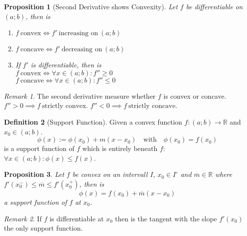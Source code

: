 \documentclass[english,titlepage]{uzhpub}
\theoremstyle{definition}
\newtheorem{definition}{Definition}[section]
\theoremstyle{plain}
\newtheorem{proposition}[definition]{Proposition}
\theoremstyle{remark}
\newtheorem*{remark}{Remark}
\theoremstyle{example}
\begin{document}
   \begin{proposition}[Second Derivative shows Convexity]\label{pro:second_deriv_convex}
      Let \(f\) be differentiable on \((a; b)\), then is
      \begin{enumerate}[label=\roman*, align=Center]
         \item \(f~\text{convex} \iff f'~\text{increasing on}~(a;b)\)
         \item \(f~\text{concave} \iff f'~\text{decreasing on}~(a;b)\)
         \item If \(f'\) is differentiable, then is\\
            \(f~\text{convex} \iff \forall x \in (a; b): f'' \geq 0\)\\
            \(f~\text{concave} \iff \forall x \in (a; b): f'' \leq 0\)
      \end{enumerate}
   \end{proposition}
   \begin{remark}
      The second derivative measure whether \(f\) is convex or concave.
      \(f'' > 0 \implies f~\text{strictly convex}\).
      \(f'' < 0 \implies f~\text{strictly concave}\).
   \end{remark}

   \begin{definition}[Support Function]
      Given a convex function \(f: (a; b) \to \mathbb{R}\) and \(x_0 \in (a; b)\).
      \[\phi(x) := \phi(x_0) + m(x - x_0) \quad\text{with}\quad \phi(x_0) = f(x_0)\]
      is a support function of \(f\) which is entirely beneath \(f\): \(\forall x \in (a;b): \phi(x) \leq f(x)\).
   \end{definition}

   \begin{proposition}\label{pro:support_func}
      Let \(f\) be convex on an intervall \(I\), \(x_0 \in I^\circ\) and \(\overline{m} \in \mathbb{R}\) where \(f'(x_0^-) \leq \overline{m} \leq f'(x_0^+)\), then is
      \[\phi(x) = f(x_0) + \overline{m}(x - x_0)\]
      a support function of \(f\) at \(x_0\).
   \end{proposition}
   \begin{remark}
      If \(f\) is differentiable at \(x_0\) then is the tangent with the slope \(f'(x_0)\) the only support function.
   \end{remark}
\end{document}
